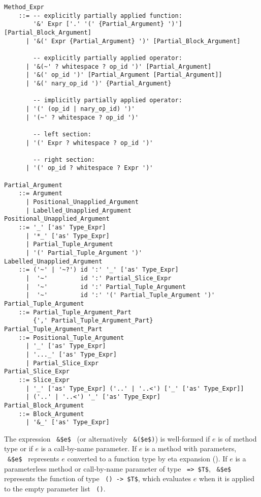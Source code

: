 \grammar\begin{lstlisting}
Method_Expr 
    ::= -- explicitly partially applied function:
        '&' Expr ['.' '(' {Partial_Argument} ')'] [Partial_Block_Argument]
      | '&(' Expr {Partial_Argument} ')' [Partial_Block_Argument]

        -- explicitly partially applied operator:
      | '&(~' ? whitespace ? op_id ')' [Partial_Argument]
      | '&(' op_id ')' [Partial_Argument [Partial_Argument]]
      | '&(' nary_op_id ')' {Partial_Argument}

        -- implicitly partially applied operator:
      | '(' (op_id | nary_op_id) ')'
      | '(~' ? whitespace ? op_id ')'

        -- left section:
      | '(' Expr ? whitespace ? op_id ')'

        -- right section:
      | '(' op_id ? whitespace ? Expr ')'

Partial_Argument
    ::= Argument
      | Positional_Unapplied_Argument
      | Labelled_Unapplied_Argument
Positional_Unapplied_Argument
    ::= '_' ['as' Type_Expr]
      | '*_' ['as' Type_Expr]
      | Partial_Tuple_Argument
      | '(' Partial_Tuple_Argument ')'
Labelled_Unapplied_Argument
    ::= ('~' | '~?') id ':' '_' ['as' Type_Expr]
      |  '~'         id ':' Partial_Slice_Expr
      |  '~'         id ':' Partial_Tuple_Argument
      |  '~'         id ':' '(' Partial_Tuple_Argument ')'
Partial_Tuple_Argument
    ::= Partial_Tuple_Argument_Part
        {',' Partial_Tuple_Argument_Part}
Partial_Tuple_Argument_Part
    ::= Positional_Tuple_Argument
      | '_' ['as' Type_Expr]
      | '..._' ['as' Type_Expr]
      | Partial_Slice_Expr
Partial_Slice_Expr
    ::= Slice_Expr
      | '_' ['as' Type_Expr] ('..' | '..<') ['_' ['as' Type_Expr]]
      | ('..' | '..<') '_' ['as' Type_Expr]
Partial_Block_Argument
    ::= Block_Argument
      | '&_' ['as' Type_Expr]
\end{lstlisting}

The expression ~\lstinline!&$e$!~ (or alternatively ~\lstinline!&($e$)!) is well-formed if $e$ is of method type or if $e$ is a call-by-name parameter. If $e$ is a method with parameters, ~\lstinline!&$e$!~ represents $e$ converted to a function type by eta expansion (). If $e$ is a parameterless method or call-by-name parameter of type ~\lstinline!=> $T$!, ~\lstinline!&$e$!~ represents the function of type ~\lstinline!() -> $T$!, which evaluates $e$ when it is applied to the empty parameter list ~\lstinline!()!. 

